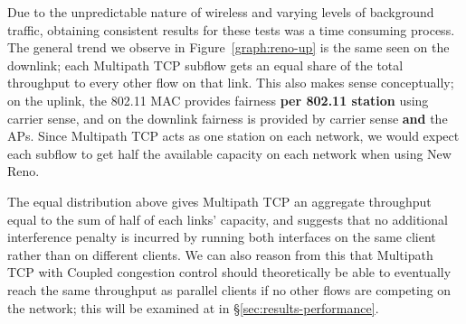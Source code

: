 Due to the unpredictable nature of wireless and varying levels of background
traffic, obtaining consistent results for these tests was a time consuming
process. The general trend we observe in Figure~\ref{graph:reno-up} is the
same seen on the downlink; each Multipath TCP subflow gets an equal
share of the total throughput to every other flow on that link. This also makes
sense conceptually; on the uplink, the 802.11 MAC provides fairness
\textbf{per 802.11 station} using carrier sense, and on the downlink
fairness is provided by carrier sense \textbf{and} the APs. Since Multipath TCP
acts as one station on each network, we would expect each subflow to get half
the available capacity on each network when using New Reno.

The equal distribution above gives Multipath TCP an aggregate throughput equal
to the sum of half of each links' capacity, and suggests that no additional interference
penalty is incurred by running both interfaces on the same client rather than on
different clients. We can also reason from this that Multipath TCP with Coupled
congestion control should theoretically be able to eventually reach the same
throughput as parallel clients if no other flows are competing on the network; 
this will be examined at in \S\ref{sec:results-performance}.

